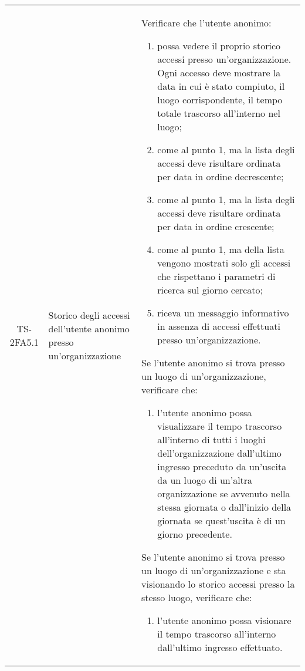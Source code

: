 {\begin{longtable}{ c | C{3cm} | C{11cm} }
TS-2FA5.1 & Storico degli accessi dell'utente anonimo presso un'organizzazione & 
Verificare che l'utente anonimo:
\begin{enumerate}
    \item possa vedere il proprio storico accessi presso un'organizzazione. Ogni accesso deve mostrare la data in cui è stato compiuto, il luogo corrispondente, il tempo totale trascorso all'interno nel luogo;
    \item come al punto 1, ma la lista degli accessi deve risultare ordinata per data in ordine decrescente;
    \item come al punto 1, ma la lista degli accessi deve risultare ordinata per data in ordine crescente;
    \item come al punto 1, ma della lista vengono mostrati solo gli accessi che rispettano i parametri di ricerca sul giorno cercato;
    \item riceva un messaggio informativo in assenza di accessi effettuati presso un'organizzazione.
\end{enumerate}
Se l'utente anonimo si trova presso un luogo di un'organizzazione, verificare che:
\begin{enumerate}
    \item l'utente anonimo possa visualizzare il tempo trascorso all'interno di tutti i luoghi dell'organizzazione dall'ultimo ingresso preceduto da un'uscita da un luogo di un'altra organizzazione se avvenuto nella stessa giornata o dall'inizio della giornata se quest'uscita è di un giorno precedente. %
\end{enumerate}
Se l'utente anonimo si trova presso un luogo di un'organizzazione e sta visionando lo storico accessi presso la stesso luogo, verificare che:
\begin{enumerate}
    \item l'utente anonimo possa visionare il tempo trascorso all'interno dall'ultimo ingresso effettuato.
\end{enumerate} \\


\end{longtable}}
